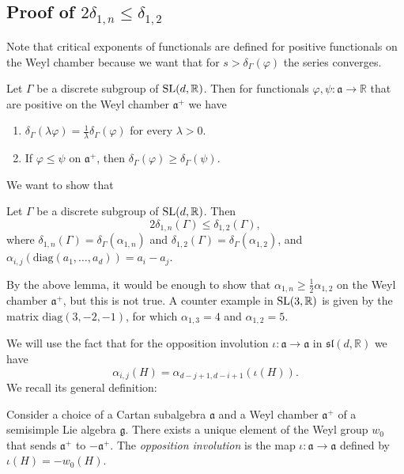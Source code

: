 \documentclass{report}
\begin{document}
\subsection[Proof of 2d(1,n) <= d(1,2)]{Proof of $2\delta_{1,n} \leq \delta_{1,2}$}
Note that critical exponents of functionals are defined for positive functionals on the Weyl chamber because we want that for $s > \delta_\Gamma(\varphi)$ the series converges.
\begin{lemma}
    Let $\Gamma$ be a discrete subgroup of $\operatorname{{\mathrm{SL}}}(d,\mathbb R)$.
    Then for functionals $\varphi, \psi: \mathfrak a \to \mathbb R$ that are positive on the Weyl chamber $\mathfrak a^+$ we have
    \begin{enumerate}[label=(\roman*)]
        \item $\delta_\Gamma(\lambda \varphi) = \frac{1}{\lambda} \delta_\Gamma(\varphi)$ for every $\lambda > 0$.
        \item If $\varphi \leq \psi$ on $\mathfrak a^+$, then $\delta_\Gamma(\varphi) \geq \delta_\Gamma(\psi)$.
    \end{enumerate}
\end{lemma}

We want to show that
\begin{proposition}\label{prop:critical_exponent_inequality}
    Let $\Gamma$ be a discrete subgroup of $\operatorname{{\mathrm{SL}}}(d,\mathbb R)$.
    Then
    \[
    2 \delta_{1,n}(\Gamma) \leq \delta_{1,2}(\Gamma),
    \]
    where $\delta_{1,n}(\Gamma) = \delta_\Gamma(\alpha_{1,n})$ and $\delta_{1,2}(\Gamma) = \delta_\Gamma(\alpha_{1,2})$, and $\alpha_{i,j}(\mathrm{diag}(a_1, \ldots, a_d)) = a_i - a_j$.
\end{proposition}
By the above lemma, it would be enough to show that $\alpha_{1,n} \geq \frac{1}{2} \alpha_{1,2}$ on the Weyl chamber $\mathfrak a^+$, but this is not true.
A counter example in $\operatorname{{\mathrm{SL}}}(3,\mathbb R)$ is given by the matrix $\mathrm{diag}(3, -2, -1)$, for which $\alpha_{1,3} = 4$ and $\alpha_{1,2} = 5$.

We will use the fact that for the opposition involution $\iota: \mathfrak a \to \mathfrak a$ in $\mathfrak{sl}(d,\mathbb R)$ we have
\[
\alpha_{i,j}(H) = \alpha_{d-j+1, d-i+1}(\iota(H)).
\]
We recall its general definition:
\begin{definition}
    Consider a choice of a Cartan subalgebra $\mathfrak a$ and a Weyl chamber $\mathfrak a^+$ of a semisimple Lie algebra $\mathfrak g$.
    There exists a unique element of the Weyl group $w_0$ that sends $\mathfrak a^+$ to $-\mathfrak a^+$.
    The \emph{opposition involution} is the map $\iota: \mathfrak a \to \mathfrak a$ defined by $\iota(H) = - w_0(H)$.
\end{definition}
\end{document}
